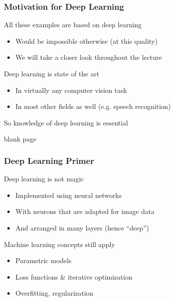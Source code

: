 \documentclass[xetex,professionalfont]{beamer}
\newcommand{\eg}{\mbox{e.g.}\xspace} %
\begin{document}
\begin{frame}
\frametitle{Motivation for Deep Learning}

All these examples are based on deep learning
\begin{itemize}
    \item Would be impossible otherwise (at this quality)
    \item We will take a closer look throughout the lecture
\end{itemize}

\bigskip

Deep learning is state of the art
\begin{itemize}
    \item In virtually any computer vision task
    \item In most other fields as well (\eg speech recognition)
\end{itemize}

\bigskip

So knowledge of deep learning is essential %

\end{frame}


{
\begin{frame}


\begin{center}
\textcolor[rgb]{0.9,0.9,0.9}{blank page}
\end{center}

\end{frame}
}


\begin{frame}
\frametitle{Deep Learning Primer}

Deep learning is not magic %
\begin{itemize}
    \item Implemented using neural networks
    \item With neurons that are adapted for image data
    \item And arranged in many layers (hence \enquote{deep})
\end{itemize}

\bigskip

Machine learning concepts still apply %
\begin{itemize}
    \item Parametric models
    \item Loss functions \& iterative optimization
    \item Overfitting, regularization
\end{itemize}

\end{frame}
\end{document}
